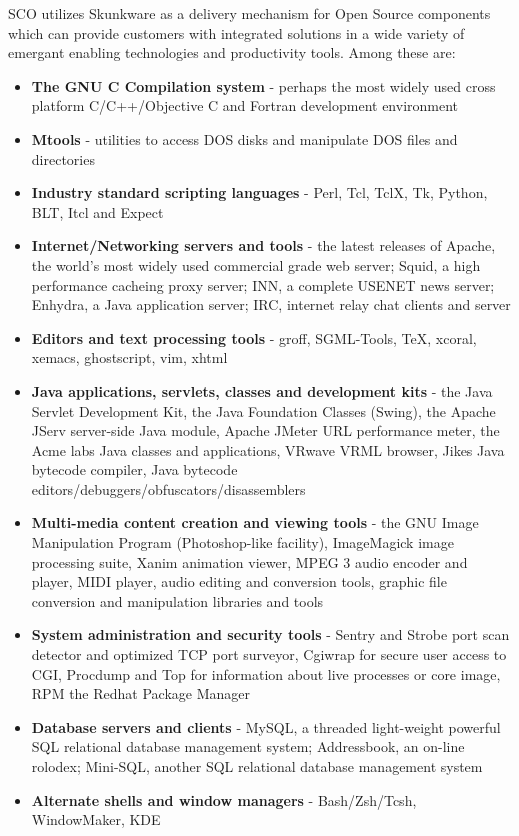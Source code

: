 \documentclass[letterpaper]{article}
\begin{document}
SCO utilizes Skunkware as a delivery mechanism for Open Source components
which can provide customers with integrated solutions in a wide variety of
emergant enabling technologies and productivity tools. Among these are:
\begin{itemize}
\item {\bfseries The GNU C Compilation system} - perhaps the most widely used 
cross platform C/C++/Objective C and Fortran development environment
\item {\bfseries Mtools} - utilities to access DOS disks and manipulate DOS files 
and directories
\item {\bfseries Industry standard scripting languages} - Perl, Tcl, TclX, Tk, 
Python, BLT, Itcl and Expect
\item {\bfseries Internet/Networking servers and tools} - the latest releases of 
Apache, the world's most widely used commercial grade web server; Squid, a high
performance cacheing proxy server; INN, a complete USENET news server; Enhydra,
a Java application server; IRC, internet relay chat clients and server
\item {\bfseries Editors and text processing tools} - groff, SGML-Tools, TeX,
xcoral, xemacs, ghostscript, vim, xhtml
\item {\bfseries Java applications, servlets, classes and development kits} - 
the Java Servlet Development Kit, the Java Foundation Classes (Swing), the 
Apache JServ server-side Java module, Apache JMeter URL performance meter, 
the Acme labs Java classes and applications, VRwave VRML browser, Jikes Java 
bytecode compiler, Java bytecode editors/debuggers/obfuscators/disassemblers
\item {\bfseries Multi-media content creation and viewing tools} - the GNU Image 
Manipulation Program (Photoshop-like facility), ImageMagick image processing
suite, Xanim animation viewer, MPEG 3 audio encoder and player, MIDI player,
audio editing and conversion tools, graphic file conversion and manipulation
libraries and tools
\item {\bfseries System administration and security tools} - Sentry and Strobe 
port scan detector and optimized TCP port surveyor, Cgiwrap for secure user 
access to CGI, Procdump and Top for information about live processes or core 
image, RPM the Redhat Package Manager
\item {\bfseries Database servers and clients} - MySQL, a threaded light-weight 
powerful SQL relational database management system; Addressbook, an on-line 
rolodex; Mini-SQL, another SQL relational database management system
\item {\bfseries Alternate shells and window managers} - Bash/Zsh/Tcsh, 
WindowMaker, KDE
\end{itemize}
\end{document}

